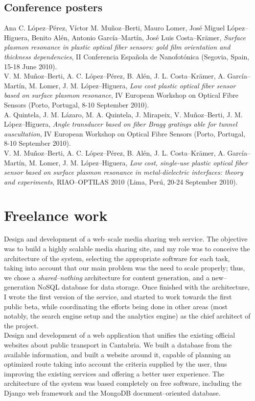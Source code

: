 \documentclass[11pt, a4paper]{article}
\newcommand{\years}[1]{\marginnote{\scriptsize #1}}
\begin{document}
\subsection*{Conference posters}
\noindent
\years{2010}Ana C. López--Pérez, Víctor M. Muñoz--Berti, Mauro Lomer, José Miguel López--Higuera, Benito Alén, Antonio García--Martín, José Luis Costa--Krämer, \textit{Surface plasmon resonance in plastic optical fiber sensors: gold film orientation and thickness dependencies}, II Conferencia Española de Nanofotónica (Segovia, Spain, 15-18 June 2010).\\
\years{2010}V. M. Muñoz--Berti, A. C. López--Pérez, B. Alén, J. L. Costa--Krämer, A. García--Martín, M. Lomer, J. M. López--Higuera, \textit{Low cost plastic optical fiber sensor based on surface plasmon resonance}, IV European Workshop on Optical Fibre Sensors (Porto, Portugal, 8-10 September 2010).\\
\years{2010}A. Quintela, J. M. Lázaro, M. A. Quintela, J. Mirapeix, V. Muñoz--Berti, J. M. López--Hi\-gue\-ra, \textit{Angle transducer based on fiber Bragg gratings able for tunnel auscultation}, IV European Workshop on Optical Fibre Sensors (Porto, Portugal, 8-10 September 2010).\\
\years{2010}V. M. Muñoz--Berti, A. C. López--Pérez, B. Alén, J. L. Costa--Krämer, A. García--Martín, M. Lomer, J. M. López--Higuera, \textit{Low cost, single-use plastic optical fiber sensor based on surface plasmon resonance in metal-dielectric interfaces: theory and experiments}, RIAO--OPTILAS 2010 (Lima, Perú, 20-24 September 2010).



\section*{Freelance work} %
\noindent
\years{2010--present}Design and development of a web--scale media sharing web service. The objective was to build a highly scalable media sharing site, and my role was to conceive the architecture of the system, selecting the appropriate software for each task, taking into account that our main problem was the need to scale properly; thus, we chose a \textit{shared--nothing} architecture for content generation, and a new--generation NoSQL database for data storage. Once finished with the architecture, I wrote the first version of the service, and started to work towards the first public beta, while coordinating the efforts being done in other areas (most notably, the search engine setup and the analytics engine) as the chief architect of the project.\\
\years{2011}Design and development of a web application that unifies the existing official websites about public transport in Cantabria. We built a database from the available information, and built a website around it, capable of planning an optimized route taking into account the criteria supplied by the user, thus improving the existing services and offering a better user experience. The architecture of the system was based completely on free software, including the Django web framework and the MongoDB document--oriented database.
\end{document}
